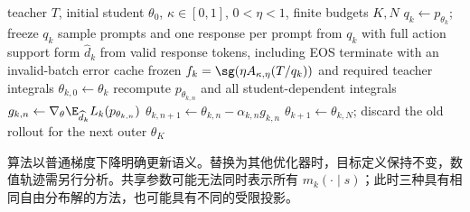 \begin{algorithm}[ht]
\caption{固定前缀的 MirrorOPD\\{\small\textit{Semantics: 根据条件目标重构；动作期望使用完整词表}}}
\begin{algorithmic}[1]
\Require teacher $T$, initial student $\theta_0$, $\kappa\in[0,1]$, $0<\eta<1$, finite budgets $K,N$
    \State $q_k\gets p_{\theta_k}$; freeze $q_k$
    \State sample prompts and one response per prompt from $q_k$ with full action support
    \State form $\widehat d_k$ from valid response tokens, including EOS
        \State terminate with an invalid-batch error
    \EndIf
    \State cache frozen $f_k=\sg(\eta A_{\kappa,\eta}(T/q_k))$ and required teacher integrals
    \State $\theta_{k,0}\gets\theta_k$
        \State recompute $p_{\theta_{k,n}}$ and all student-dependent integrals
        \State $g_{k,n}\gets\nabla_\theta\E_{\widehat d_k}L_k(p_{\theta_{k,n}})$
        \State $\theta_{k,n+1}\gets\theta_{k,n}-\alpha_{k,n}g_{k,n}$
    \EndFor
    \State $\theta_{k+1}\gets\theta_{k,N}$; discard the old rollout for the next outer
\EndFor
\State \Return $\theta_K$
\end{algorithmic}
\end{algorithm}

算法以普通梯度下降明确更新语义。替换为其他优化器时，目标定义保持不变，数值轨迹需另行分析。共享参数可能无法同时表示所有 $m_k(\cdot\mid s)$；此时三种具有相同自由分布解的方法，也可能具有不同的受限投影。
